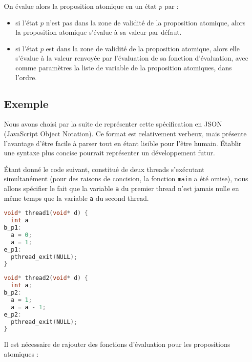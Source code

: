 On évalue alors la proposition atomique en un état \(p\) par :

\begin{itemize}
\item
  si l'état \(p\) n'est pas dans la zone de validité de la proposition
  atomique, alors la proposition atomique s'évalue à sa valeur par
  défaut.
\item
  si l'état \(p\) est dans la zone de validité de la proposition
  atomique, alors elle s'évalue à la valeur renvoyée par l'évaluation de
  sa fonction d'évaluation, avec comme paramètres la liste de variable
  de la proposition atomiques, dans l'ordre.
\end{itemize}

\subsection{Exemple}\label{exemple}

Nous avons choisi par la suite de représenter cette spécification en
JSON (JavaScript Object Notation)\cite{json}. Ce format est
relativement verbeux, mais présente l'avantage d'être facile à parser
tout en étant lisible pour l'être humain. Établir une syntaxe plus
concise pourrait représenter un développement futur.

Étant donné le code suivant, constitué de deux threads s'exécutant
simultanément (pour des raisons de concision, la fonction
\texttt{main} a été omise), nous allons spécifier le fait que la
variable \texttt{a} du premier thread n'est jamais nulle en même temps que
la variable \texttt{a} du second thread.

\noindent\begin{minipage}{.45\textwidth}
\begin{lstlisting}[language=C, frame=single, caption=Thread 1]
void* thread1(void* d) {
  int a
b_p1:
  a = 0;
  a = 1;
e_p1:
  pthread_exit(NULL);
}
\end{lstlisting}
\end{minipage}\hfill
\begin{minipage}{.45\textwidth}
\begin{lstlisting}[language=C, frame=single, caption=Thread 2]
void* thread2(void* d) {
  int a;
b_p2:
  a = 1;
  a = a - 1;
e_p2:
  pthread_exit(NULL);
}
\end{lstlisting}
\end{minipage}

Il est nécessaire de rajouter des fonctions d'évaluation pour les
propositions atomiques :

